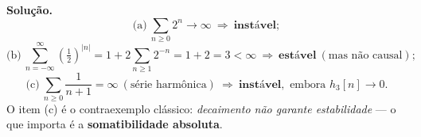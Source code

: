 

\textbf{Solução.}
\[
  \text{(a)}\ \sum_{n\ge0}2^n\to\infty\ \Rightarrow\ \textbf{instável};
\]
\[
  \text{(b)}\ \sum_{n=-\infty}^{\infty}\left(\tfrac12\right)^{|n|}
  =1+2\sum_{n\ge1}2^{-n}=1+2=3<\infty\ \Rightarrow\ \textbf{estável}
  \ (\text{mas não causal});
\]
\[
  \text{(c)}\ \sum_{n\ge0}\frac{1}{n+1}=\infty\ (\text{série harmônica})
  \ \Rightarrow\ \textbf{instável}, \text{ embora } h_3[n]\to0 .
\]
O item (c) é o contraexemplo clássico: \emph{decaimento não garante
estabilidade} — o que importa é a \textbf{somatibilidade absoluta}.

